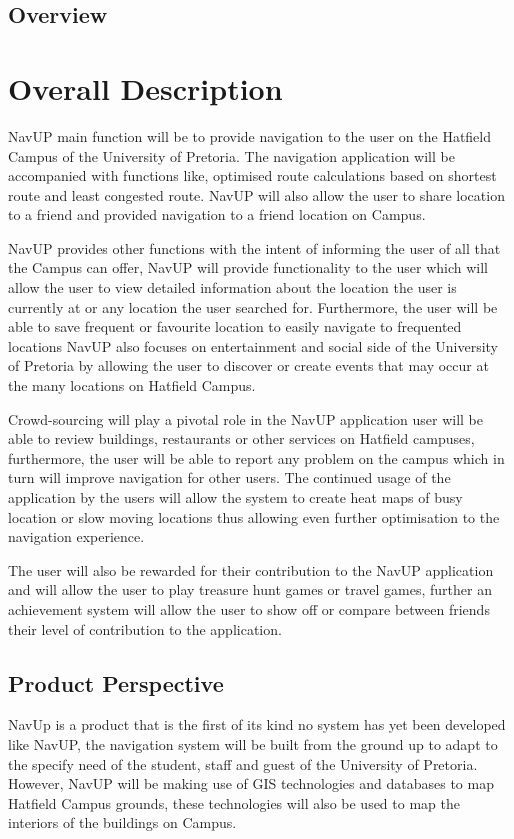 \documentclass[12pt,a4paper]{article}
\begin{document}
	\subsection{Overview}
\section{Overall Description}
NavUP main function will be to provide navigation to the user on the Hatfield Campus of the University of Pretoria. The navigation application will be accompanied with functions like, optimised route calculations based on shortest route and least congested route. NavUP will also allow the user to share location to a friend and provided navigation to a friend location on Campus.\newline

NavUP provides other functions with the intent of informing the user of all that the Campus can offer, NavUP will provide functionality to the user which will allow the user to view detailed information about the location the user is currently at or any location the user searched for. Furthermore, the user will be able to save frequent or favourite location to easily navigate to frequented locations
NavUP also focuses on entertainment and social side of the University of Pretoria by allowing the user to discover or create events that may occur at the many locations on Hatfield Campus.\newline

Crowd-sourcing will play a pivotal role in the NavUP application user will be able to review buildings, restaurants or other services on Hatfield campuses, furthermore, the user will be able to report any problem on the campus which in turn will improve navigation for other users. The continued usage of the application by the users will allow the system to create heat maps of busy location or slow moving locations thus allowing even further optimisation to the navigation experience.\newline

The user will also be rewarded for their contribution to the NavUP application and will allow the user to play treasure hunt games or travel games, further an achievement system will allow the user to show off or compare between friends their level of contribution to the application.\newline
	\subsection{Product Perspective}
		NavUp is a product that is the first of its kind no system has yet been developed like NavUP, the navigation system will be built from the ground up to adapt to the specify need of the student, staff and guest of the University of Pretoria. However, NavUP will be making use of GIS technologies and databases to map Hatfield Campus grounds, these technologies will also be used to map the interiors of the buildings on Campus.\newline
\end{document}
